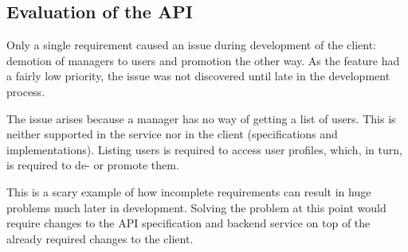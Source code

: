 \subsection{Evaluation of the API}

Only a single requirement caused an issue during development of the client:
demotion of managers to users and promotion the other way. As the feature
had a fairly low priority, the issue was not discovered until late in the
development process.

The issue arises because a manager has no way of getting a list of users. This
is neither supported in the service nor in the client (specifications and
implementations). Listing users is required to access user profiles, which, in
turn, is required to de- or promote them.

This is a scary example of how incomplete requirements can result in huge problems much
later in development. Solving the problem at this point would require changes to
the API specification and backend service on top of the already required changes
to the client.
